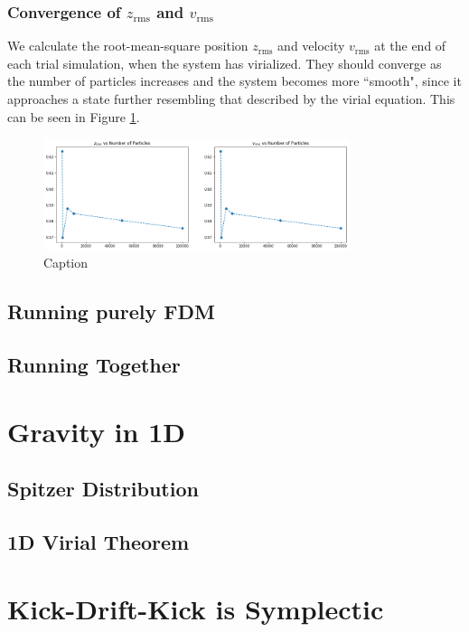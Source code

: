 \documentclass[oneside]{book}
\begin{document}
\subsection{Convergence of $z_\text{rms}$ and $v_\text{rms}$}
We calculate the root-mean-square position $z_\text{rms}$ and velocity $v_\text{rms}$ at the end of each trial simulation, when the system has virialized.
They should converge as the number of particles increases and the system becomes more ``smooth",
since it approaches a state further resembling that described by the virial equation.
This can be seen in Figure \ref{Z_rms and V_rms Final}.
\begin{figure}[h]
    \centering
    \includegraphics[width=0.8\textwidth]{Images/RMS_Convergence.png}
    \caption{Caption}
    \label{Z_rms and V_rms Final}
\end{figure}


\section{Running purely FDM}

\section{Running Together}



\appendix
\chapter{Gravity in 1D}

\section{Spitzer Distribution}\label{Spitzer+BinneyTremaineProblem}

\section{1D Virial Theorem}\label{1D Virial Theorem}

\chapter{Kick-Drift-Kick is Symplectic}\label{KDK Symplectic}


\end{document}
